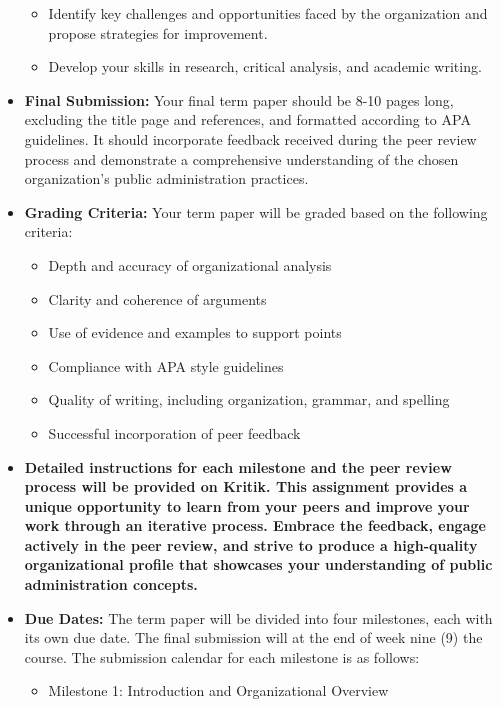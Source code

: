 \documentclass[11pt, letterpaper]{article}
\begin{document}
\begin{itemize}
\begin{itemize}
            \item Identify key challenges and opportunities faced by the organization and propose strategies for improvement.
            \item Develop your skills in research, critical analysis, and academic writing.
        \end{itemize}
    \item \textbf{Final Submission:} Your final term paper should be 8-10 pages long, excluding the title page and references, and formatted according to APA guidelines. It should incorporate feedback received during the peer review process and demonstrate a comprehensive understanding of the chosen organization's public administration practices.
    \item \textbf{Grading Criteria:} Your term paper will be graded based on the following criteria:
        \begin{itemize}
            \item Depth and accuracy of organizational analysis
            \item Clarity and coherence of arguments
            \item Use of evidence and examples to support points
            \item Compliance with APA style guidelines
            \item Quality of writing, including organization, grammar, and spelling
            \item Successful incorporation of peer feedback
        \end{itemize}
    \item \textbf{Detailed instructions for each milestone and the peer review process will be provided on Kritik. This assignment provides a unique opportunity to learn from your peers and improve your work through an iterative process. Embrace the feedback, engage actively in the peer review, and strive to produce a high-quality organizational profile that showcases your understanding of public administration concepts.}
    \item \textbf{Due Dates:} The term paper will be divided into four milestones, each with its own due date. The final submission will at the end of week nine (9) the course. The submission calendar for each milestone is as follows:
        \begin{itemize}
            \item Milestone 1: Introduction and Organizational Overview
                \begin{itemize}

\end{itemize}
\end{itemize}
\end{itemize}
\end{document}
